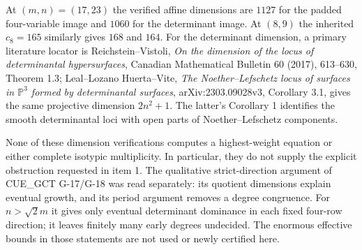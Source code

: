 At $(m,n)=(17,23)$ the verified affine dimensions are $1127$ for
the padded four-variable image and $1060$ for the determinant
image. At $(8,9)$ the inherited $c_8=165$ similarly gives $168$
and $164$. For the determinant dimension, a primary literature
locator is Reichstein--Vistoli, \emph{On the dimension of the locus
of determinantal hypersurfaces}, Canadian Mathematical Bulletin
60 (2017), 613--630, Theorem 1.3; Leal--Lozano Huerta--Vite,
\emph{The Noether--Lefschetz locus of surfaces in $\mathbb P^3$
formed by determinantal surfaces}, arXiv:2303.09028v3,
Corollary 3.1, gives the same projective dimension $2n^2+1$.
The latter's Corollary 1 identifies the smooth determinantal
loci with open parts of Noether--Lefschetz components.

None of these dimension verifications computes a highest-weight
equation or either complete isotypic multiplicity. In particular,
they do not supply the explicit obstruction requested in item 1.
The qualitative strict-direction argument of CUE\_GCT G-17/G-18
was read separately: its quotient dimensions explain eventual
growth, and its period argument removes a degree congruence.
For $n>\sqrt2m$ it gives only eventual determinant dominance
in each fixed four-row direction; it leaves finitely many early
degrees undecided. The enormous effective bounds in those
statements are not used or newly certified here.
